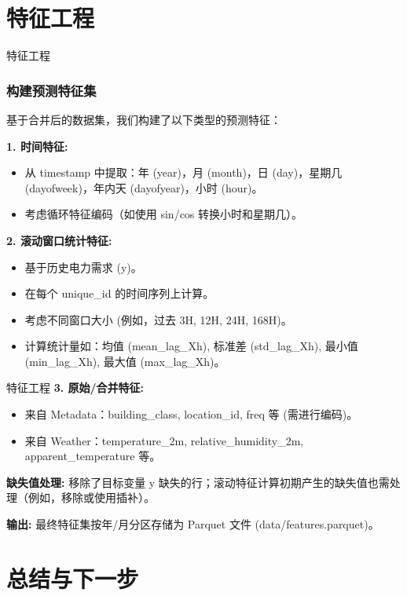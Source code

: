 \documentclass{beamer} %
\begin{document}
\section{特征工程}
\begin{frame}{特征工程}
    \frametitle{构建预测特征集}
    基于合并后的数据集，我们构建了以下类型的预测特征：

    \textbf{1. 时间特征:}
    \begin{itemize}
        \item 从 timestamp 中提取：年 (year)，月 (month)，日 (day)，星期几 (dayofweek)，年内天 (dayofyear)，小时 (hour)。
        \item 考虑循环特征编码（如使用 sin/cos 转换小时和星期几）。
    \end{itemize}
    
    \textbf{2. 滚动窗口统计特征:}
    
    \begin{itemize}
        \item 基于历史电力需求 (y)。
        \item 在每个 unique\_id 的时间序列上计算。
        \item 考虑不同窗口大小 (例如，过去 3H, 12H, 24H, 168H)。
        \item 计算统计量如：均值 (mean\_lag\_Xh), 标准差 (std\_lag\_Xh), 最小值 (min\_lag\_Xh), 最大值 (max\_lag\_Xh)。
    \end{itemize}
\end{frame}
\begin{frame}{特征工程}
    \textbf{3. 原始/合并特征:}
    
    \begin{itemize}
        \item 来自 Metadata：building\_class, location\_id, freq 等 (需进行编码)。
        \item 来自 Weather：temperature\_2m, relative\_humidity\_2m, apparent\_temperature 等。
    \end{itemize}
    \textbf{缺失值处理:} 移除了目标变量 y 缺失的行；滚动特征计算初期产生的缺失值也需处理（例如，移除或使用插补）。
    
    \textbf{输出:} 最终特征集按年/月分区存储为 Parquet 文件 (data/features.parquet)。
\end{frame}


\section{总结与下一步}
\end{document}
